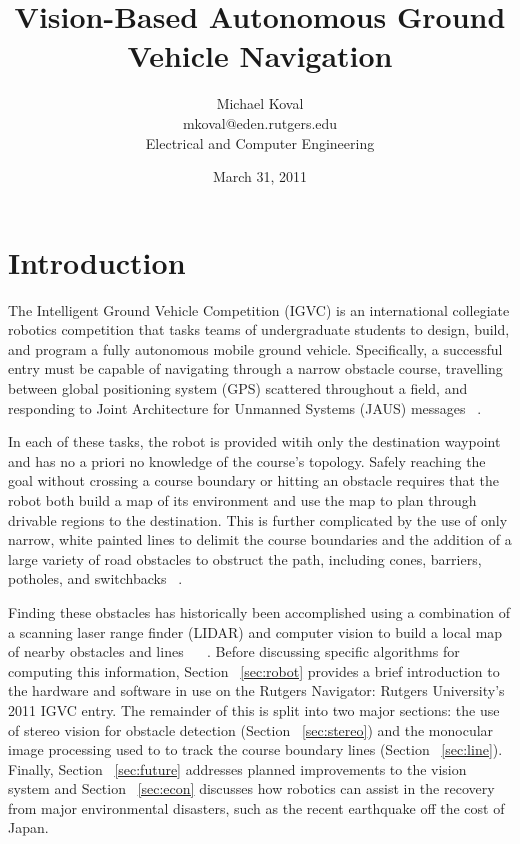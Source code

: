 \documentclass[11pt,twocolumn]{article}
\title{Vision-Based Autonomous Ground Vehicle Navigation}
\date{March 31, 2011}
\author{
	Michael Koval \\
	mkoval@eden.rutgers.edu \\
	Electrical and Computer Engineering
}
\begin{document}
\maketitle

\section{Introduction}
\label{sec:intro}
The Intelligent Ground Vehicle Competition (IGVC) is an international
collegiate robotics competition that tasks teams of undergraduate students to
design, build, and program a fully autonomous mobile ground vehicle.
Specifically, a successful entry must be capable of navigating through a narrow
obstacle course, travelling between  global positioning system (GPS) scattered
throughout a field, and responding to Joint Architecture for Unmanned Systems
(JAUS) messages ~\cite{igvc11}.

In each of these tasks, the robot is provided witih only the destination
waypoint and has no a priori no knowledge of the course's topology. Safely
reaching the goal without crossing a course boundary or hitting an obstacle
requires that the robot both build a map of its environment and use the map to
plan through drivable regions to the destination. This is further complicated
by the use of only narrow, white painted lines to delimit the course boundaries
and the addition of a large variety of road obstacles to obstruct the path,
including cones, barriers, potholes, and switchbacks
~\cite{igvc11}.

Finding these obstacles has historically been accomplished using a combination
of a scanning laser range finder (LIDAR) and computer vision to build a local
map of nearby obstacles and lines ~\cite{princeton08} ~\cite{delaware08}.
Before discussing specific algorithms for computing this information, Section
~\ref{sec:robot} provides a brief introduction to the hardware and software in
use on the Rutgers Navigator: Rutgers University's 2011 IGVC entry. The
remainder of this is split into two major sections: the use of stereo vision
for obstacle detection (Section ~\ref{sec:stereo}) and the monocular image
processing used to to track the course boundary lines (Section
~\ref{sec:line}). Finally, Section ~\ref{sec:future} addresses planned
improvements to the vision system and Section ~\ref{sec:econ} discusses how
robotics can assist in the recovery from major environmental disasters, such as
the recent earthquake off the cost of Japan.
\end{document}
